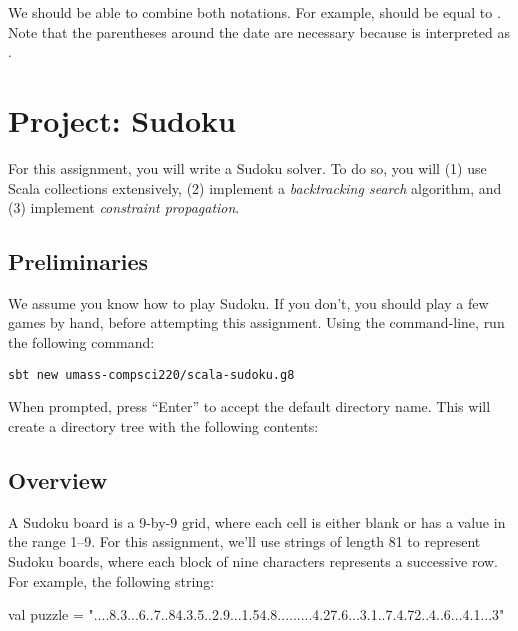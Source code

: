 \documentclass[9pt]{extbook}
\begin{document}
We should be able to combine both notations. For example,  should be equal to . Note that the parentheses around the date are necessary because  is interpreted as . 



\chapter{Project: Sudoku}

For this assignment, you will write a Sudoku solver. To do so, you will
(1) use Scala collections extensively, (2) implement a \emph{backtracking
search} algorithm, and (3) implement \emph{constraint propagation}.

\section{Preliminaries}

We assume you know how to play Sudoku. If you don't, you should play a few
games by hand, before attempting this assignment.
Using the command-line, run the following command:

\begin{lstlisting}
sbt new umass-compsci220/scala-sudoku.g8
\end{lstlisting}

When prompted, press ``Enter'' to accept the default directory name. This will
create a directory tree with the following contents:



\section{Overview}

A Sudoku board is a 9-by-9 grid, where each cell is either blank or has a
value in the range 1--9. For this assignment, we'll use strings of length
81 to represent Sudoku boards, where each block of nine characters
represents a successive row. For example, the following string:

\begin{scalacode}
val puzzle =
  "....8.3...6..7..84.3.5..2.9...1.54.8.........4.27.6...3.1..7.4.72..4..6...4.1...3"
\end{scalacode}
\end{document}
